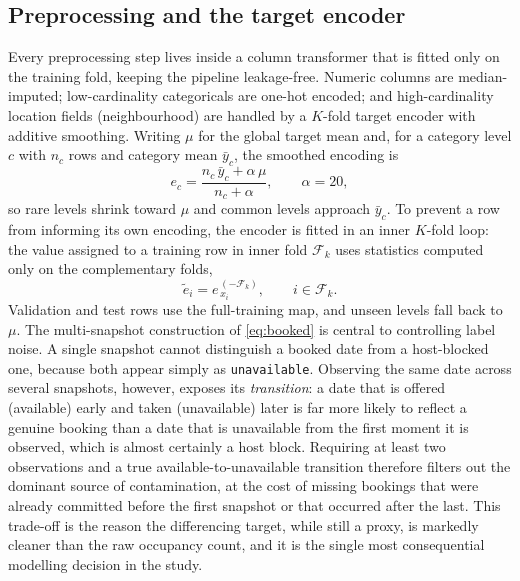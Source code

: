 \documentclass[journal]{IEEEtran}
\begin{document}
\subsection{Preprocessing and the target encoder}
Every preprocessing step lives inside a column transformer that is fitted only on
the training fold, keeping the pipeline leakage-free. Numeric columns are
median-imputed; low-cardinality categoricals are one-hot encoded; and
high-cardinality location fields (neighbourhood) are handled by a $K$-fold target
encoder with additive smoothing. Writing $\mu$ for the global target mean and,
for a category level $c$ with $n_c$ rows and category mean $\bar y_c$, the
smoothed encoding is
\begin{equation}
e_c=\frac{n_c\,\bar y_c+\alpha\,\mu}{n_c+\alpha},\qquad \alpha=20,
\label{eq:te}
\end{equation}
so rare levels shrink toward $\mu$ and common levels approach $\bar y_c$. To
prevent a row from informing its own encoding, the encoder is fitted in an inner
$K$-fold loop: the value assigned to a training row in inner fold $\mathcal F_k$
uses statistics computed only on the complementary folds,
\begin{equation}
\tilde e_i=e^{\,(-\mathcal F_k)}_{\,x_i},\qquad i\in\mathcal F_k.
\label{eq:tekfold}
\end{equation}
Validation and test rows use the full-training map, and unseen levels fall back to
$\mu$. The multi-snapshot construction of \eqref{eq:booked} is central to
controlling label noise. A single snapshot cannot distinguish a booked date from a
host-blocked one, because both appear simply as \texttt{unavailable}. Observing the
same date across several snapshots, however, exposes its \emph{transition}: a date
that is offered (available) early and taken (unavailable) later is far more likely
to reflect a genuine booking than a date that is unavailable from the first moment
it is observed, which is almost certainly a host block. Requiring at least two
observations and a true available-to-unavailable transition therefore filters out
the dominant source of contamination, at the cost of missing bookings that were
already committed before the first snapshot or that occurred after the last. This
trade-off is the reason the differencing target, while still a proxy, is markedly
cleaner than the raw occupancy count, and it is the single most consequential
modelling decision in the study.
\end{document}
